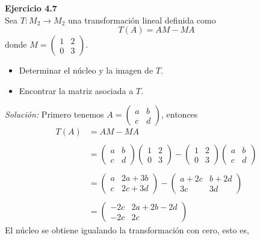 \documentclass{article}
\newenvironment{problem}[2][Ejercicio]
    { \begin{mdframed}[backgroundcolor=gray!20] \textbf{#1 #2} \\}
    {  \end{mdframed}}
\newenvironment{solution}
    {\textit{Solución:}}
    {}
\begin{document}
\begin{problem}{4.7}
    Sea $T : M_2 \to M_2$ una transformación lineal definida como
\[
T(A) = AM - MA
\]
donde $M=\begin{pmatrix} 1 & 2 \\ 0 & 3 \end{pmatrix}.$
\begin{itemize}
\item 
Determinar el núcleo y la imagen de $T$.
\item 
Encontrar la matriz asociada a $T$.
\end{itemize}
\end{problem}

\begin{solution}
    Primero tenemos $A=\begin{pmatrix} a & b \\ c & d \end{pmatrix}$, entonces
\[
\begin{aligned}
T(A) &= AM - MA \\ \\
&= \begin{pmatrix} a & b \\ c & d \end{pmatrix}\begin{pmatrix} 1 & 2 \\ 0 & 3 \end{pmatrix} - \begin{pmatrix} 1 & 2 \\ 0 & 3 \end{pmatrix} \begin{pmatrix} a & b \\ c & d \end{pmatrix} \\ \\
&= \begin{pmatrix} a & 2a+3b \\ c & 2c+3d \end{pmatrix} - \begin{pmatrix} a+2c & b+2d \\ 3c & 3d \end{pmatrix} \\ \\
&= \begin{pmatrix} -2c & 2a+2b-2d \\ -2c & 2c \end{pmatrix}
\end{aligned}
\]
El núcleo se obtiene igualando la transformación con cero, esto es,

\end{solution}
\end{document}
